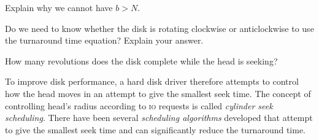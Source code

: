 \frmrule

\begin{example}
Explain why we cannot have $b > N$.
\end{example}

\begin{example}
Do we need to know whether the disk is rotating clockwise or anticlockwise to use 
the turnaround time equation? Explain your answer.
\end{example}

\begin{example}
How many revolutions does the disk complete while the head is seeking?
\end{example}




\frmrule


To improve disk performance, a hard disk driver therefore attempts
to control how the head moves in an attempt to give the smallest seek time. 
The concept of controlling head's radius according to \textsc{io} requests is called 
\textit{cylinder seek scheduling}. There have been several \textit{scheduling algorithms} 
developed that attempt to give the smallest seek time and can significantly reduce 
the turnaround time.  



\begin{figure}[h]
\end{figure}

